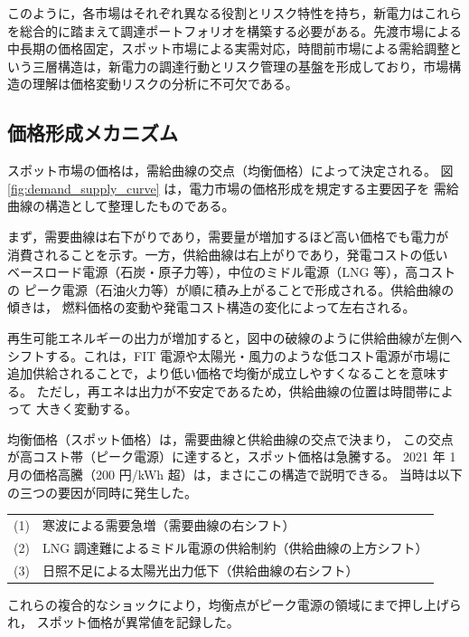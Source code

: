 このように，各市場はそれぞれ異なる役割とリスク特性を持ち，新電力はこれらを総合的に踏まえて調達ポートフォリオを構築する必要がある。先渡市場による中長期の価格固定，スポット市場による実需対応，時間前市場による需給調整という三層構造は，新電力の調達行動とリスク管理の基盤を形成しており，市場構造の理解は価格変動リスクの分析に不可欠である。


\subsection{価格形成メカニズム}

スポット市場の価格は，需給曲線の交点（均衡価格）によって決定される。
図 \ref{fig:demand_supply_curve} は，電力市場の価格形成を規定する主要因子を
需給曲線の構造として整理したものである。

まず，需要曲線は右下がりであり，需要量が増加するほど高い価格でも電力が
消費されることを示す。一方，供給曲線は右上がりであり，発電コストの低い
ベースロード電源（石炭・原子力等），中位のミドル電源（LNG 等），高コストの
ピーク電源（石油火力等）が順に積み上がることで形成される。供給曲線の傾きは，
燃料価格の変動や発電コスト構造の変化によって左右される。

再生可能エネルギーの出力が増加すると，図中の破線のように供給曲線が左側へ
シフトする。これは，FIT 電源や太陽光・風力のような低コスト電源が市場に
追加供給されることで，より低い価格で均衡が成立しやすくなることを意味する。
ただし，再エネは出力が不安定であるため，供給曲線の位置は時間帯によって
大きく変動する。

均衡価格（スポット価格）は，需要曲線と供給曲線の交点で決まり，
この交点が高コスト帯（ピーク電源）に達すると，スポット価格は急騰する。
2021 年 1 月の価格高騰（200 円/kWh 超）は，まさにこの構造で説明できる。
当時は以下の三つの要因が同時に発生した。


\begin{flushleft}
\hspace{1.5em}
\begin{tabular}{@{}ll}
(1) & 寒波による需要急増（需要曲線の右シフト）\\
(2) & LNG 調達難によるミドル電源の供給制約（供給曲線の上方シフト）\\
(3) & 日照不足による太陽光出力低下（供給曲線の右シフト）
\end{tabular}
\end{flushleft}



これらの複合的なショックにより，均衡点がピーク電源の領域にまで押し上げられ，
スポット価格が異常値を記録した。

